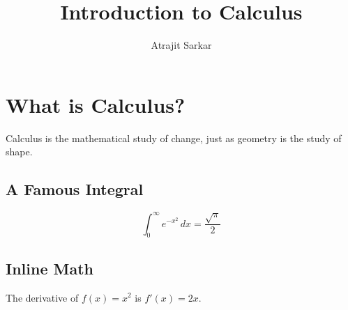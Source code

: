 \def\pgfsysdriver{pgfsys-tex4ht.def}\documentclass{article}
\title{Introduction to Calculus}
\author{Atrajit Sarkar}
\date{}
\begin{document}
\maketitle

\section*{What is Calculus?}
Calculus is the mathematical study of change, just as geometry is the study of shape.

\subsection*{A Famous Integral}
\[
\int_{0}^{\infty} e^{-x^2} \, dx = \frac{\sqrt{\pi}}{2}
\]

\subsection*{Inline Math}
The derivative of $f(x) = x^2$ is $f'(x) = 2x$.
\end{document}
